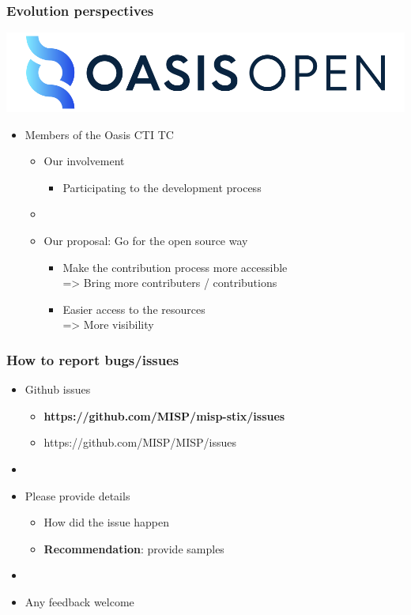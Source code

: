 \begin{frame}
    \frametitle{Evolution perspectives}
    \begin{center}
        \includegraphics[scale=0.1]{images/oasis.png}
    \end{center}
    \vspace{1em}
    \begin{itemize}
        \item Members of the Oasis CTI TC
        \begin{itemize}
            \item Our involvement
            \begin{itemize}
                \item Participating to the development process
            \end{itemize}
            \item []
            \item Our proposal: Go for the open source way
            \begin{itemize}
                \item Make the contribution process more accessible \\
                => Bring more contributers / contributions
                \item Easier access to the resources \\
                => More visibility
            \end{itemize}
        \end{itemize}
    \end{itemize}
\end{frame}

\begin{frame}
    \frametitle{How to report bugs/issues}
    \begin{itemize}
        \item Github issues
        \begin{itemize}
            \item {\bf https://github.com/MISP/misp-stix/issues}
            \item https://github.com/MISP/MISP/issues
        \end{itemize}
        \item []
        \item Please provide details
        \begin{itemize}
            \item How did the issue happen
            \item {\bf Recommendation}: provide samples
        \end{itemize}
        \item[]
        \item Any feedback welcome
    \end{itemize}
\end{frame}

